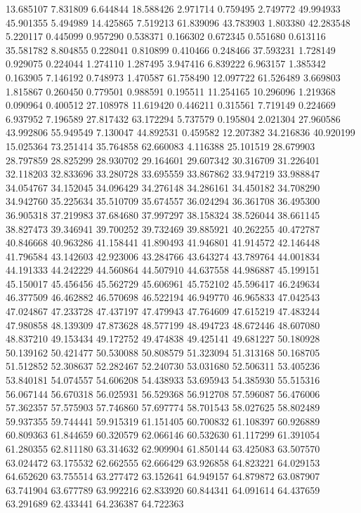 13.685107
7.831809
6.644844
18.588426
2.971714
0.759495
2.749772
49.994933
45.901355
5.494989
14.425865
7.519213
61.839096
43.783903
1.803380
42.283548
5.220117
0.445099
0.957290
0.538371
0.166302
0.672345
0.551680
0.613116
35.581782
8.804855
0.228041
0.810899
0.410466
0.248466
37.593231
1.728149
0.929075
0.224044
1.274110
1.287495
3.947416
6.839222
6.963157
1.385342
0.163905
7.146192
0.748973
1.470587
61.758490
12.097722
61.526489
3.669803
1.815867
0.260450
0.779501
0.988591
0.195511
11.254165
10.296096
1.219368
0.090964
0.400512
27.108978
11.619420
0.446211
0.315561
7.719149
0.224669
6.937952
7.196589
27.817432
63.172294
5.737579
0.195804
2.021304
27.960586
43.992806
55.949549
7.130047
44.892531
0.459582
12.207382
34.216836
40.920199
15.025364
73.251414
35.764858
62.660083
4.116388
25.101519
28.679903
28.797859
28.825299
28.930702
29.164601
29.607342
30.316709
31.226401
32.118203
32.833696
33.280728
33.695559
33.867862
33.947219
33.988847
34.054767
34.152045
34.096429
34.276148
34.286161
34.450182
34.708290
34.942760
35.225634
35.510709
35.674557
36.024294
36.361708
36.495300
36.905318
37.219983
37.684680
37.997297
38.158324
38.526044
38.661145
38.827473
39.346941
39.700252
39.732469
39.885921
40.262255
40.472787
40.846668
40.963286
41.158441
41.890493
41.946801
41.914572
42.146448
41.796584
43.142603
42.923006
43.284766
43.643274
43.789764
44.001834
44.191333
44.242229
44.560864
44.507910
44.637558
44.986887
45.199151
45.150017
45.456456
45.562729
45.606961
45.752102
45.596417
46.249634
46.377509
46.462882
46.570698
46.522194
46.949770
46.965833
47.042543
47.024867
47.233728
47.437197
47.479943
47.764609
47.615219
47.483244
47.980858
48.139309
47.873628
48.577199
48.494723
48.672446
48.607080
48.837210
49.153434
49.172752
49.474838
49.425141
49.681227
50.180928
50.139162
50.421477
50.530088
50.808579
51.323094
51.313168
50.168705
51.512852
52.308637
52.282467
52.240730
53.031680
52.506311
53.405236
53.840181
54.074557
54.606208
54.438933
53.695943
54.385930
55.515316
56.067144
56.670318
56.025931
56.529368
56.912708
57.596087
56.476006
57.362357
57.575903
57.746860
57.697774
58.701543
58.027625
58.802489
59.937355
59.744441
59.915319
61.151405
60.700832
61.108397
60.926889
60.809363
61.844659
60.320579
62.066146
60.532630
61.117299
61.391054
61.280355
62.811180
63.314632
62.909904
61.850144
63.425083
63.507570
63.024472
63.175532
62.662555
62.666429
63.926858
64.823221
64.029153
64.652620
63.755514
63.277472
63.152641
64.949157
64.879872
63.087907
63.741904
63.677789
63.992216
62.833920
60.844341
64.091614
64.437659
63.291689
62.433441
64.236387
64.722363
